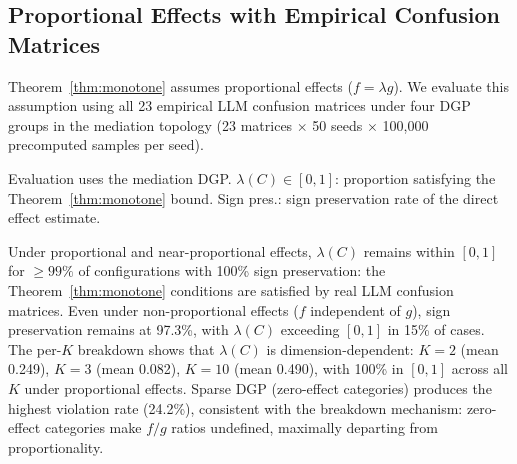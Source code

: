 \subsection{Proportional Effects with Empirical Confusion Matrices}
\label{sec:proportional_real_matrices}

Theorem~\ref{thm:monotone} assumes proportional effects ($f = \lambda g$). We evaluate this assumption using all 23 empirical LLM confusion matrices under four DGP groups in the mediation topology (23 matrices $\times$ 50 seeds $\times$ 100{,}000 precomputed samples per seed).

Evaluation uses the mediation DGP. $\lambda(C) \in [0,1]$: proportion satisfying the Theorem~\ref{thm:monotone} bound. Sign pres.: sign preservation rate of the direct effect estimate.

\begin{table}[H]
\centering
\small
\caption{Proportional effects validation with 23 real LLM confusion matrices.}
\label{tab:proportional_empirical}
\end{table}

Under proportional and near-proportional effects, $\lambda(C)$ remains within $[0,1]$ for ${\geq}99\%$ of configurations with 100\% sign preservation: the Theorem~\ref{thm:monotone} conditions are satisfied by real LLM confusion matrices. Even under non-proportional effects ($f$ independent of $g$), sign preservation remains at 97.3\%, with $\lambda(C)$ exceeding $[0,1]$ in 15\% of cases. The per-$K$ breakdown shows that $\lambda(C)$ is dimension-dependent: $K{=}2$ (mean 0.249), $K{=}3$ (mean 0.082), $K{=}10$ (mean 0.490), with 100\% in $[0,1]$ across all $K$ under proportional effects. Sparse DGP (zero-effect categories) produces the highest violation rate (24.2\%), consistent with the breakdown mechanism: zero-effect categories make $f/g$ ratios undefined, maximally departing from proportionality.


